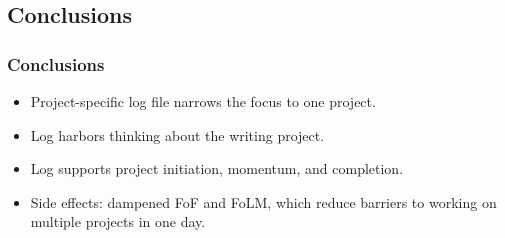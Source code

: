 \documentclass[aspectratio=169]{beamer}
\begin{document}
\subsection{Conclusions}
\begin{frame}
\frametitle{Conclusions}
\Large{
\begin{itemize}[font=$\bullet$\scshape\bfseries]
    \item Project-specific log file narrows the focus to one project.
    \item Log harbors thinking about the writing project. 
    \item Log supports project initiation, momentum, and completion.
    \item Side effects: dampened FoF and FoLM, which reduce barriers to working on multiple projects in one day.
\end{itemize}
}
\end{frame}

\end{document}

